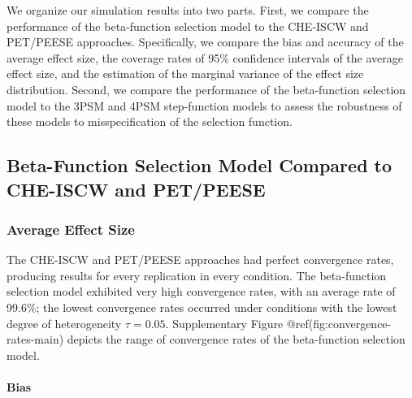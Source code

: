 \documentclass[
]{article}
\newenvironment{Shaded}{\begin{snugshade}}{\end{snugshade}}
\newcommand{\AttributeTok}[1]{\textcolor[rgb]{0.13,0.29,0.53}{#1}}
\newcommand{\FunctionTok}[1]{\textcolor[rgb]{0.13,0.29,0.53}{\textbf{#1}}}
\newcommand{\NormalTok}[1]{#1}
\newcommand{\OtherTok}[1]{\textcolor[rgb]{0.56,0.35,0.01}{#1}}
\newcommand{\SpecialCharTok}[1]{\textcolor[rgb]{0.81,0.36,0.00}{\textbf{#1}}}
\newcommand{\StringTok}[1]{\textcolor[rgb]{0.31,0.60,0.02}{#1}}
\begin{document}
\begin{Shaded}
\end{Shaded}

We organize our simulation results into two parts. First, we compare the
performance of the beta-function selection model to the CHE-ISCW and
PET/PEESE approaches. Specifically, we compare the bias and accuracy of
the average effect size, the coverage rates of 95\% confidence intervals
of the average effect size, and the estimation of the marginal variance
of the effect size distribution. Second, we compare the performance of
the beta-function selection model to the 3PSM and 4PSM step-function
models to assess the robustness of these models to misspecification of
the selection function.

\subsection{Beta-Function Selection Model Compared to CHE-ISCW and
PET/PEESE}\label{beta-function-selection-model-compared-to-che-iscw-and-petpeese}

\subsubsection{Average Effect Size}\label{average-effect-size}

The CHE-ISCW and PET/PEESE approaches had perfect convergence rates,
producing results for every replication in every condition. The
beta-function selection model exhibited very high convergence rates,
with an average rate of 99.6\%; the lowest convergence rates occurred
under conditions with the lowest degree of heterogeneity
\(\tau = 0.05\). Supplementary Figure @ref(fig:convergence-rates-main)
depicts the range of convergence rates of the beta-function selection
model.

\paragraph{Bias}\label{bias}
\end{document}
